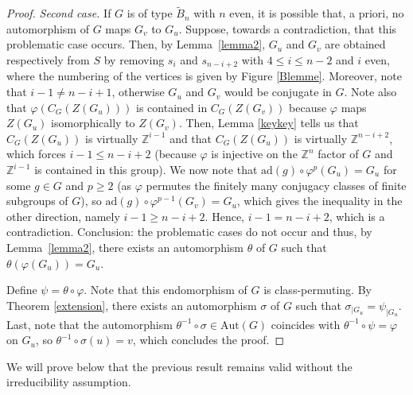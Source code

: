 \documentclass[a4paper, 11pt]{amsart}
\theoremstyle{definition}
\theoremstyle{remark}
\renewcommand{\leq}{\leqslant}
\renewcommand{\geq}{\geqslant}
\begin{document}
\begin{proof}
\emph{Second case.} If $G$ is of type $\tilde{B}_n$ with $n$ even, it is possible that, a priori, no automorphism of $G$ maps $G_v$ to $G_u$. Suppose, towards a contradiction, that this problematic case occurs. Then, by Lemma~\ref{lemma2}, $G_u$ and $G_v$ are obtained respectively from $S$ by removing $s_i$ and $s_{n-i+2}$ with $4\leq i\leq n-2$ and $i$ even, where the numbering of the vertices is given by Figure \ref{Blemme}. Moreover, note that $i-1\neq n-i+1$, otherwise $G_u$ and $G_v$ would be conjugate in $G$. Note also that $\varphi(C_G(Z(G_u)))$ is contained in $C_G(Z(G_v))$ because $\varphi$ maps $Z(G_u)$ isomorphically to $Z(G_v)$. Then, Lemma \ref{keykey} tells us that $C_G(Z(G_u))$ is virtually $\mathbb{Z}^{i-1}$ and that $C_G(Z(G_u))$ is virtually $\mathbb{Z}^{n-i+2}$, which forces $i-1\leq n-i+2$ (because $\varphi$ is injective on the $\mathbb{Z}^n$ factor of $G$ and $\mathbb{Z}^{i-1}$ is contained in this group). We now note that $\mathrm{ad}(g)\circ \varphi^p(G_u)=G_u$ for some $g\in G$ and $p\geq 2$ (as $\varphi$ permutes the finitely many conjugacy classes of finite subgroups of $G$), so $\mathrm{ad}(g)\circ \varphi^{p-1}(G_v)=G_u$, which gives the inequality in the other direction, namely $i-1\geq n-i+2$. Hence, $i-1=n-i+2$, which is a contradiction. Conclusion: the problematic cases do not occur and thus, by Lemma~\ref{lemma2}, there exists an automorphism $\theta$ of $G$ such that $\theta(\varphi(G_u))=G_u$. 

Define $\psi=\theta \circ \varphi$. Note that this endomorphism of $G$ is class-permuting. By Theorem \ref{extension}, there exists an automorphism $\sigma$ of $G$ such that $\sigma_{\vert G_u}=\psi_{\vert G_u}$. Last, note that the automorphism $\theta^{-1}\circ \sigma\in\mathrm{Aut}(G)$ coincides with $\theta^{-1}\circ \psi=\varphi$ on $G_u$, so $\theta^{-1}\circ \sigma(u)=v$, which concludes the proof.\end{proof}



We will prove below that the previous result remains valid without the irreducibility assumption.
\end{document}
